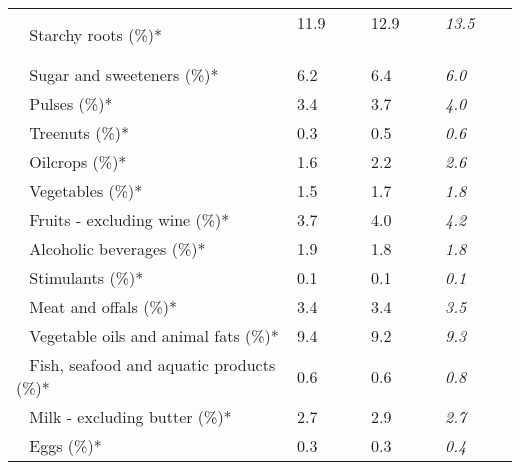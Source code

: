 \begin{tabular}{L{3.9cm} R{1cm} R{1cm} R{1cm}}
	 ~ Starchy roots (\%)* & 11.9 ~ \ \ & 12.9 ~ \ \ & \textit{13.5} ~ \ \ \\ 
	 ~ Sugar and sweeteners (\%)* & 6.2 ~ \ \ & 6.4 ~ \ \ & \textit{6.0} ~ \ \ \\ 
	 ~ Pulses (\%)* & 3.4 ~ \ \ & 3.7 ~ \ \ & \textit{4.0} ~ \ \ \\ 
	 ~ Treenuts (\%)* & 0.3 ~ \ \ & 0.5 ~ \ \ & \textit{0.6} ~ \ \ \\ 
	 ~ Oilcrops (\%)* & 1.6 ~ \ \ & 2.2 ~ \ \ & \textit{2.6} ~ \ \ \\ 
	 ~ Vegetables (\%)* & 1.5 ~ \ \ & 1.7 ~ \ \ & \textit{1.8} ~ \ \ \\ 
	 ~ Fruits - excluding wine (\%)* & 3.7 ~ \ \ & 4.0 ~ \ \ & \textit{4.2} ~ \ \ \\ 
	 ~ Alcoholic beverages (\%)* & 1.9 ~ \ \ & 1.8 ~ \ \ & \textit{1.8} ~ \ \ \\ 
	 ~ Stimulants (\%)* & 0.1 ~ \ \ & 0.1 ~ \ \ & \textit{0.1} ~ \ \ \\ 
	 ~ Meat and offals (\%)* & 3.4 ~ \ \ & 3.4 ~ \ \ & \textit{3.5} ~ \ \ \\ 
	 ~ Vegetable oils and animal fats (\%)* & 9.4 ~ \ \ & 9.2 ~ \ \ & \textit{9.3} ~ \ \ \\ 
	 ~ Fish, seafood and aquatic products (\%)* & 0.6 ~ \ \ & 0.6 ~ \ \ & \textit{0.8} ~ \ \ \\ 
	 ~ Milk - excluding butter (\%)* & 2.7 ~ \ \ & 2.9 ~ \ \ & \textit{2.7} ~ \ \ \\ 
	 ~ Eggs (\%)* & 0.3 ~ \ \ & 0.3 ~ \ \ & \textit{0.4} ~ \ \ \\ 
       \toprule
      \end{tabular}
      \clearpage
{}
